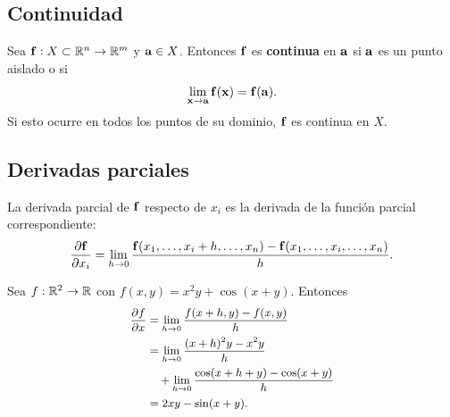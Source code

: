 \subsection{Continuidad}
\label{subsec:continuidad_vectorial}

\begin{definicion}[Continuidad]
  \label{def:continuidad_vectorial}
  Sea $\mathbf{f}:X\subset\mathbb{R}^n\rightarrow\mathbb{R}^m$ y $\mathbf{a}\in X$. Entonces $\mathbf{f}$
  es \textbf{continua} en $\mathbf{a}$ si $\mathbf{a}$ es un punto aislado o si
  \begin{equation}
    \label{eq:continuidad_vectorial}
    \lim_{\mathbf{x}\rightarrow\mathbf{a}}\mathbf{f}(\mathbf{x})=\mathbf{f}(\mathbf{a}).
  \end{equation}
  Si esto ocurre en todos los puntos de su dominio, $\mathbf{f}$ es continua en
  $X$.
\end{definicion}

\subsection{Derivadas parciales}
\label{subsec:derivadas_parciales}

\begin{definicion}
  \label{def:derivada_parcial}
  La derivada parcial de $\mathbf{f}$ respecto de $x_i$ es la derivada de la
  funci\'on parcial correspondiente:
  \begin{equation}
    \label{eq:derivada_parcial}
    \small
    \frac{\partial \mathbf{f}}{\partial x_i}=\lim_{h\rightarrow 0}
      \frac{\mathbf{f}(x_1,\dots,x_i+h,\dots,x_n)
            -\mathbf{f}(x_1,\dots,x_i,\dots,x_n)}{h}.
  \end{equation}
\end{definicion}

\begin{ejemplo}
  \label{ej:parcial_escalar}
  Sea $f:\mathbb{R}^2\rightarrow\mathbb{R}$ con $f(x,y)=x^2y+\cos(x+y)$. Entonces
  \begin{equation}
    \label{eq:parcial_escalar}
    \small
    \begin{aligned}
      \frac{\partial f}{\partial x}
        &=\lim_{h\rightarrow 0}\frac{f(x+h,y)-f(x,y)}{h}\\
        &=\lim_{h\rightarrow 0}\frac{(x+h)^2y-x^2y}{h}\\
        &\quad+\lim_{h\rightarrow 0}
          \frac{\cos(x+h+y)-\cos(x+y)}{h}\\
        &=2xy-\sin(x+y).
    \end{aligned}
  \end{equation}
\end{ejemplo}

